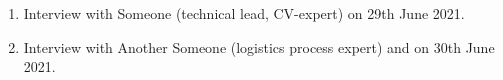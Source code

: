 \begin{enumerate}
	\item \label{meeting:Someone} Interview with Someone (technical lead, \ac{CV}-expert) on 29th June 2021.
	\item \label{meeting:Another Someone} Interview with Another Someone (logistics process expert) and on 30th June 2021.

	
	
\end{enumerate}	
